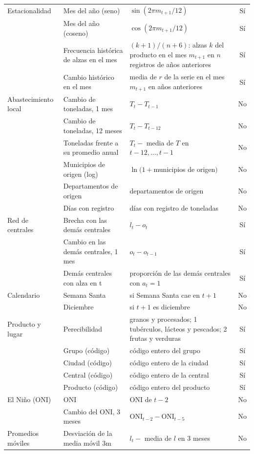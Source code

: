 \begin{longtable}{>{\raggedright\arraybackslash}p{2.3cm}>{\raggedright\arraybackslash}p{4.1cm}>{\raggedright\arraybackslash}p{6.2cm}c}
Estacionalidad & Mes del año (seno) & $\sin(2\pi m_{t+1}/12)$ & Sí \\
 & Mes del año (coseno) & $\cos(2\pi m_{t+1}/12)$ & Sí \\
 & Frecuencia histórica de alzas en el mes & $(k+1)/(n+6)$: alzas $k$ del producto en el mes $m_{t+1}$ en $n$ registros de años anteriores & Sí \\
 & Cambio histórico en el mes & media de $r$ de la serie en el mes $m_{t+1}$ en años anteriores & Sí \\
\addlinespace[2pt]
Abastecimiento local & Cambio de toneladas, 1 mes & $T_t-T_{t-1}$ & No \\
 & Cambio de toneladas, 12 meses & $T_t-T_{t-12}$ & No \\
 & Toneladas frente a su promedio anual & $T_t-$ media de $T$ en $t-12,\dots,t-1$ & No \\
 & Municipios de origen (log) & $\ln(1+$municipios de origen$)$ & No \\
 & Departamentos de origen & departamentos de origen & No \\
 & Días con registro & días con registro de toneladas & No \\
\addlinespace[2pt]
Red de centrales & Brecha con las demás centrales & $l_t-o_t$ & Sí \\
 & Cambio en las demás centrales, 1 mes & $o_t-o_{t-1}$ & Sí \\
 & Demás centrales con alza en t & proporción de las demás centrales con $a_t=1$ & Sí \\
\addlinespace[2pt]
Calendario & Semana Santa & 1 si Semana Santa cae en $t+1$ & No \\
 & Diciembre & 1 si $t+1$ es diciembre & No \\
\addlinespace[2pt]
Producto y lugar & Perecibilidad & 0 granos y procesados; 1 tubérculos, lácteos y pescados; 2 frutas y verduras & Sí \\
 & Grupo (código) & código entero del grupo & Sí \\
 & Ciudad (código) & código entero de la ciudad & Sí \\
 & Central (código) & código entero de la central & Sí \\
 & Producto (código) & código entero del producto & Sí \\
\addlinespace[2pt]
El Niño (ONI) & ONI & ONI de $t-2$ & No \\
 & Cambio del ONI, 3 meses & ONI$_{t-2}-$ONI$_{t-5}$ & No \\
\addlinespace[2pt]
Promedios móviles & Desviación de la media móvil 3m & $l_t-$ media de $l$ en 3 meses & No \\

\end{longtable}
